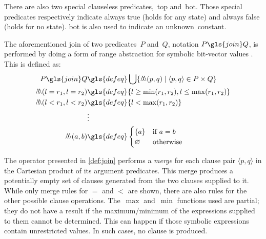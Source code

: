 There are also two special clauseless predicates,~\gls{top}%
and~\gls{bot}.
Those special predicates respectively indicate always true (holds for any state) and always false (holds for no state).
\Gls{bot} is also used to indicate an unknown~\gls{constant}.%
\begin{definition}\label{def:join}
  The aforementioned join
  of two predicates~$P$ and~$Q$,%
  notation $P\gls{join}Q$,
  is performed by doing a form of range abstraction for symbolic bit-vector values \autocite{rugina2000symbolic}.
  This is defined as:
  \begin{align*} %
    P\gls{join}Q &\gls{defeq} \bigcup\{\merge(p,q) \mid \langle p,q\rangle\in P\times Q\} \\
    \merge(l=r_1,l=r_2) &\gls{defeq} \{l\ge\min(r_1,r_2),l\le\max(r_1,r_2)\} \\
    \merge(l<r_1,l<r_2) &\gls{defeq} \{l<\max(r_1,r_2)\} \\
    &\vdots\\
    \merge(a,b) &\gls{defeq}
    \begin{cases}
      \{a\} & \text{if }a=b \\
      \varnothing & \text{otherwise}
    \end{cases}
  \end{align*}
\end{definition}
The operator presented in \cref{def:join}
performs a \emph{merge} for each clause pair
$\langle p,q\rangle$
in the Cartesian product %
of its argument predicates.
This merge produces a potentially empty set of clauses
generated from the two clauses supplied to it.
While only merge rules for $=$ and $<$ are shown, there are also rules
for the other possible clause operations.
The~$\max$ and~$\min$ functions used are partial;%
%
%
they do not have a result if the maximum/minimum of the expressions supplied to them cannot be determined.%
This can happen if those symbolic expressions
contain unrestricted values.
In such cases, no clause is produced.

